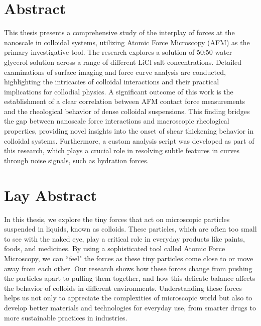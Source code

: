 \section{Abstract}

This thesis presents a comprehensive study of the interplay of forces at the nanoscale in colloidal systems, utilizing Atomic Force Microscopy (AFM) as the primary investigative tool. The research explores a solution of 50:50 water glycerol solution across a range of different LiCl salt concentrations. Detailed examinations of surface imaging and force curve analysis are conducted, highlighting the intricacies of colloidal interactions and their practical implications for collodial physics. A significant outcome of this work is the establishment of a clear correlation between AFM contact force measurements and the rheological behavior of dense colloidal suspensions. This finding bridges the gap between nanoscale force interactions and macroscopic rheological properties, providing novel insights into the onset of shear thickening behavior in colloidal systems. Furthermore, a custom analysis script was developed as part of this research, which plays a crucial role in resolving subtle features in curves through noise signals, such as hydration forces. 


\section{Lay Abstract}

In this thesis, we explore the tiny forces that act on microscopic particles suspended in liquids, known as colloids. These particles, which are often too small to see with the naked eye, play a critical role in everyday products like paints, foods, and medicines. By using a sophisticated tool called Atomic Force Microscopy, we can ``feel" the forces as these tiny particles come close to or move away from each other. Our research shows how these forces change from pushing the particles apart to pulling them together, and how this delicate balance affects the behavior of colloids in different environments. Understanding these forces helps us not only to appreciate the complexities of microscopic world but also to develop better materials and technologies for everyday use, from smarter drugs to more sustainable practices in industries.
